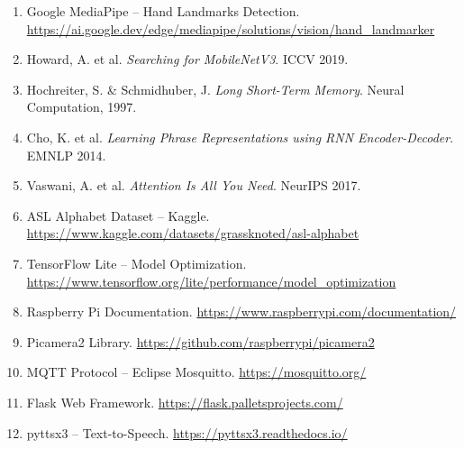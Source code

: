 \begin{enumerate}
    \item Google MediaPipe -- Hand Landmarks Detection. \url{https://ai.google.dev/edge/mediapipe/solutions/vision/hand_landmarker}
    \item Howard, A. et al. \textit{Searching for MobileNetV3}. ICCV 2019.
    \item Hochreiter, S. \& Schmidhuber, J. \textit{Long Short-Term Memory}. Neural Computation, 1997.
    \item Cho, K. et al. \textit{Learning Phrase Representations using RNN Encoder-Decoder}. EMNLP 2014.
    \item Vaswani, A. et al. \textit{Attention Is All You Need}. NeurIPS 2017.
    \item ASL Alphabet Dataset -- Kaggle. \url{https://www.kaggle.com/datasets/grassknoted/asl-alphabet}
    \item TensorFlow Lite -- Model Optimization. \url{https://www.tensorflow.org/lite/performance/model_optimization}
    \item Raspberry Pi Documentation. \url{https://www.raspberrypi.com/documentation/}
    \item Picamera2 Library. \url{https://github.com/raspberrypi/picamera2}
    \item MQTT Protocol -- Eclipse Mosquitto. \url{https://mosquitto.org/}
    \item Flask Web Framework. \url{https://flask.palletsprojects.com/}
    \item pyttsx3 -- Text-to-Speech. \url{https://pyttsx3.readthedocs.io/}
\end{enumerate}
